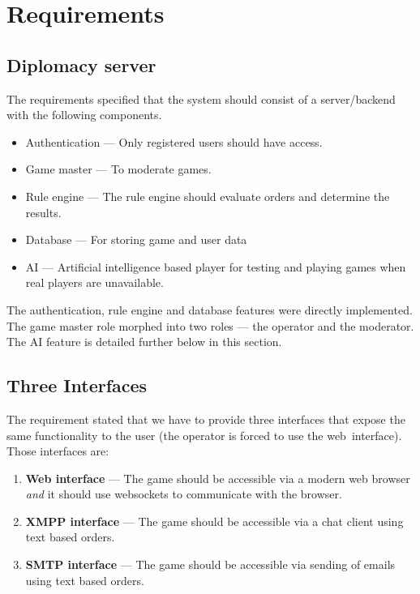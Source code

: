 \documentclass[11pt,a4paper]{report}
\begin{document}
\section{Requirements}

\subsection{Diplomacy server}
The requirements specified that the system should consist of
a server/backend with the following components.

\begin{itemize}
\item Authentication --- Only registered users should have access.
\item Game master --- To moderate games.
\item Rule engine --- The rule engine should evaluate orders and determine
      the results.
\item Database --- For storing game and user data
\item AI --- Artificial intelligence based player for testing and playing games
      when real players are unavailable.
\end{itemize}

The authentication, rule engine and database features were directly
implemented. The game master role morphed into two roles --- the operator and
the moderator. The AI feature is detailed further below in this section.

\subsection{Three Interfaces}
The requirement stated that we have to provide three interfaces that expose
the same functionality to the user (the operator is forced to use the
web~interface). Those interfaces are:\\
\begin{enumerate}
\item {\bf Web interface} ---
  The game should be accessible via a modern web browser {\em and\/} it should
  use websockets to communicate with the browser.
\item {\bf XMPP interface} ---
  The game should be accessible via a chat client using text based orders.
\item {\bf SMTP interface} ---
  The game should be accessible via sending of emails using text based orders.
\end{enumerate}
\end{document}
